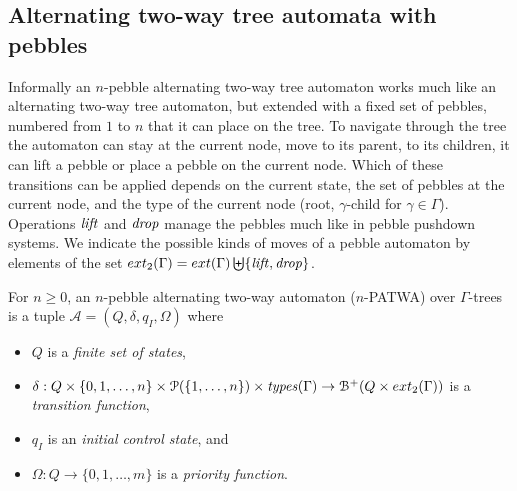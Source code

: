 \documentclass[a4paper,UKenglish,cleveref, autoref, thm-restate]{lipics-v2021}
\begin{document}


\subsection{Alternating two-way tree automata with pebbles}

Informally an $n$-pebble alternating two-way tree automaton works much like an alternating two-way tree automaton, but extended with a fixed set of pebbles, numbered from $1$ to $n$ that it can place on the tree. 
To navigate through the tree the automaton can stay at the current node, move to its parent, to its 
 children, it can lift a pebble or place a pebble on the current node.
 Which of these transitions can be applied depends on the current state, the set
 of pebbles at the current node, 
and the type of the current node (root, $\gamma$-child for $\gamma \in \Gamma$). 
Operations $\text{\textit{lift}}$ and $\text{\textit{drop}}$ manage the
pebbles much like in pebble pushdown systems.
We indicate the possible kinds of moves of a pebble automaton by elements of the set 
$ext_2(\Gamma) = ext(\Gamma) \biguplus \{ \text{\textit{lift}}, \text{\textit{drop}}\}$.

\begin{samepage}
\begin{definition}
For $n\geq 0$, an $n$-pebble alternating two-way automaton ($n$-PATWA) over  
$\Gamma$-trees is a tuple
$\mathcal{A} = (Q,   
\delta , q_I , 
\Omega)$ where
\begin{itemize}
\item $Q$ is a {\em finite set of states},
\item $\delta  : Q  \times \{ 0, 1, \ldots, n\} \times \mathcal{P}(\{ 1, \ldots, n\}) \times 
\text{\textit{types}}(\Gamma)
  \to  \mathcal{B}^+ (Q \times ext_2(\Gamma))$ is a {\em transition function},
\item $q_I$ is an {\em initial control state}, and
\item $\Omega : Q \to \{ 0, 1, \ldots, m\}$ is a {\em priority function}.
\end{itemize}
\end{definition}
\end{samepage}
 
\end{document}
